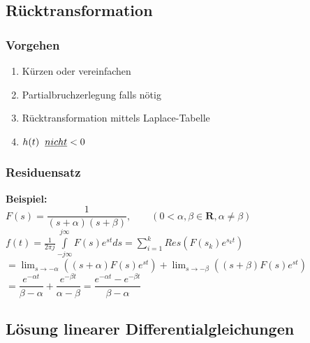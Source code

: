\newpage
\renewcommand{\arraystretch}{\arraystretchOriginal}		
	\subsection{Rücktransformation}
		\subsubsection{Vorgehen}
			\begin{enumerate}
				\item Kürzen oder vereinfachen
				\item Partialbruchzerlegung falls nötig 
				\item Rücktransformation mittels Laplace-Tabelle
				\item $h(t)\hspace{0.2cm}\underline{nicht} < 0$
			\end{enumerate}
			
		\subsubsection{Residuensatz}
			\textbf{Beispiel:}\\[2mm]
			$F(s) = \dfrac{1}{(s+\alpha)(s+\beta)}, \qquad (0 < \alpha,\beta \in \mathbf{R}, \alpha \neq \beta)$\\[2mm]
			$f(t) = \frac{1}{2\pi j} \int\limits_{-j\infty}^{j\infty} F(s)e^{st} ds = \sum\limits_{i=1}^k Res(F(s_k)e^{s_kt})$\\[2mm]
			$=\lim_{s \to -\alpha} ((s+\alpha)F(s)e^{st}) + \lim_{s \to -\beta}((s+\beta)F(s)e^{st})$\\[2mm]
			$=\dfrac{e^{-\alpha t}}{\beta - \alpha} + \dfrac{e^{-\beta t}}{\alpha - \beta} = \dfrac{e^{-\alpha t}-e^{-\beta t}}{\beta - \alpha}$
			

	
	\subsection{Lösung linearer Differentialgleichungen }
			
